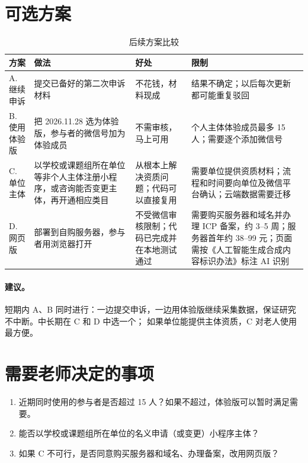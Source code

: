 \documentclass[11pt,a4paper,plain,CN,colored-proof=false,
  load-custom-latin-font-file=pku-font-latin.tex,
  load-custom-math-font-file=pku-font-math.tex,
  load-custom-cjk-font-file=pku-font-cjk.tex]{einfart}
\begin{document}
\clearpage
\section{可选方案}

\begin{table}[htbp]
\centering
\caption{后续方案比较}
\label{tab:options}
\small
\begin{tabularx}{\textwidth}{@{}lYYY@{}}
\toprule
方案 & 做法 & 好处 & 限制\\
\midrule
A. 继续申诉 & 提交已备好的第二次申诉材料 & 不花钱，材料现成 & 结果不确定；以后每次更新都可能重复驳回\\
\addlinespace[3pt]
B. 使用体验版 & 把 2026.11.28 选为体验版，参与者的微信号加为体验成员 & 不需审核，马上可用 & 个人主体体验成员最多 15 人；需要逐个添加微信号\\
\addlinespace[3pt]
C. 单位主体 & 以学校或课题组所在单位等非个人主体注册小程序，或咨询能否变更主体，再开通相应类目 & 从根本上解决资质问题；代码可以直接复用 & 需要单位提供资质材料；流程和时间要向单位及微信平台确认；云端数据需要迁移\\
\addlinespace[3pt]
D. 网页版 & 部署到自购服务器，参与者用浏览器打开 & 不受微信审核限制；代码已完成并在本地测试通过 & 需要购买服务器和域名并办理 ICP 备案，约 3–5 周；服务器首年约 38–99 元；页面需按《人工智能生成合成内容标识办法》标注 AI 识别\\
\bottomrule
\end{tabularx}
\end{table}
\FloatBarrier

\paragraph{建议。}短期内 A、B 同时进行：一边提交申诉，一边用体验版继续采集数据，保证研究不中断。中长期在 C 和 D 中选一个；
如果单位能提供主体资质，C 对老人使用最方便。

\section{需要老师决定的事项}

\begin{enumerate}
  \item 近期同时使用的参与者是否超过 15 人？如果不超过，体验版可以暂时满足需要。
  \item 能否以学校或课题组所在单位的名义申请（或变更）小程序主体？
  \item 如果 C 不可行，是否同意购买服务器和域名、办理备案，改用网页版？
\end{enumerate}
\end{document}
